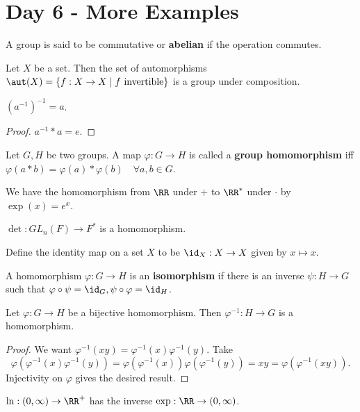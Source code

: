 \section{Day 6 - More Examples}

\begin{df}
A group is said to be commutative or \textbf{abelian} if the operation
commutes.
\end{df}

\begin{ex}
Let $X$ be a set. Then the set of automorphisms $\aut(X) = \lbrace f : X
\to X \mid f \textrm{ invertible} \rbrace$ is a group under composition.
\end{ex}

\begin{prop}
$(a^{-1})^{-1} = a$.
\end{prop}

\begin{proof}
$a^{-1} * a = e$.
\end{proof}

\begin{df}
Let $G, H$ be two groups. A map $\varphi : G \to H$ is called a
\textbf{group homomorphism} iff $\varphi(a * b) = \varphi(a) *
\varphi(b) \quad \forall a, b \in G$.
\end{df}

\begin{ex}
We have the homomorphism from $\RR$ under $+$ to $\RR^*$ under $\cdot$
by $\exp(x) = e^x$.
\end{ex}

\begin{ex}
$\det : GL_n(F) \to F^*$ is a homomorphism.
\end{ex}

\begin{df}
Define the identity map on a set $X$ to be $\id_X : X \to X$ given by $x
\mapsto x$.
\end{df}

\begin{df}
A homomorphism $\varphi : G \to H$ is an \textbf{isomorphism} if there
is an inverse $\psi : H \to G$ such that $\varphi \circ \psi = \id_G,
\psi \circ \varphi = \id_H$.
\end{df}

\begin{prop}
Let $\varphi : G \to H$ be a bijective homomorphism. Then $\varphi^{-1}
: H \to G$ is a homomorphism.
\end{prop}

\begin{proof}
We want $\varphi^{-1}(xy) = \varphi^{-1}(x) \varphi^{-1}(y)$. Take
\[ \varphi(\varphi^{-1}(x) \varphi^{-1}(y)) = \varphi(\varphi^{-1}(x))
\varphi(\varphi^{-1}(y)) = xy = \varphi(\varphi^{-1}(xy)). \]
Injectivity on $\varphi$ gives the desired result.
\end{proof}

\begin{ex}
$\ln : (0, \infty) \to \RR^+$ has the inverse $\exp : \RR \to (0,
\infty)$.
\end{ex}
